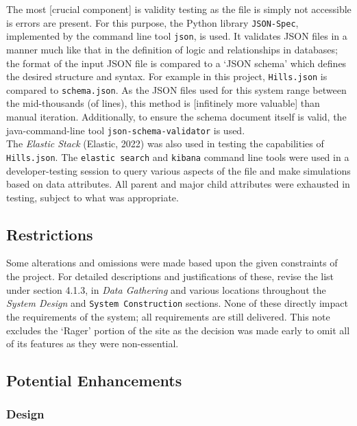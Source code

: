 \documentclass[11pt, english]{article}
\begin{document}
	The most [crucial component] is validity testing as the file is simply not accessible is errors are present. For this purpose, the Python library \texttt{JSON-Spec}, implemented by the command line tool \texttt{json}, is used. It validates JSON files in a manner much like that in the definition of logic and relationships in databases; the format of the input JSON file is compared to a `JSON schema' which defines the desired structure and syntax. For example in this project, \texttt{Hills.json} is compared to \texttt{schema.json}. As the JSON files used for this system range between the mid-thousands (of lines), this method is [infitinely more valuable] than manual iteration. Additionally, to ensure the schema document itself is valid, the java-command-line tool \texttt{json-schema-validator} is used.\\

	The \textit{Elastic Stack} (Elastic, 2022) was also used in testing the capabilities of \texttt{Hills.json}. The \texttt{elastic search} and \texttt{kibana} command line tools were used in a developer-testing session to query various aspects of the file and make simulations based on data attributes. All parent and major child attributes were exhausted in testing, subject to what was appropriate.\\

	\subsection{Restrictions}

	Some alterations and omissions were made based upon the given constraints of the project. For detailed descriptions and justifications of these, revise the list under section 4.1.3, in \textit{Data Gathering} and various locations throughout the \textit{System Design} and \texttt{System Construction} sections. None of these directly impact the requirements of the system; all requirements are still delivered. This note excludes the `Rager' portion of the site as the decision was made early to omit all of its features as they were non-essential.

	\subsection{Potential Enhancements}

		\subsubsection{Design}
	
\end{document}
